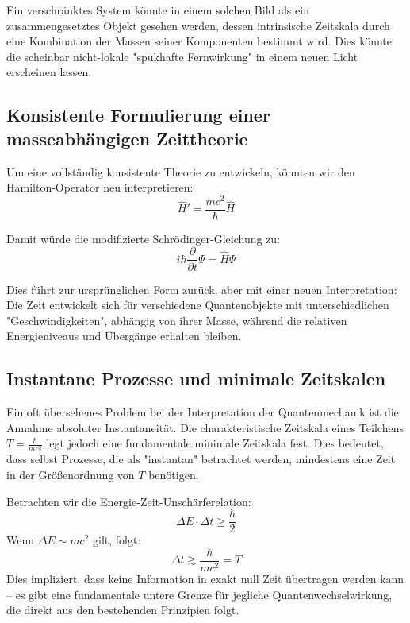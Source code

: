 \documentclass{article}
\begin{document}
	Ein verschränktes System könnte in einem solchen Bild als ein zusammengesetztes Objekt gesehen werden, dessen intrinsische Zeitskala durch eine Kombination der Massen seiner Komponenten bestimmt wird. Dies könnte die scheinbar nicht-lokale "spukhafte Fernwirkung" in einem neuen Licht erscheinen lassen.
	
	\subsection{Konsistente Formulierung einer masseabhängigen Zeittheorie}
	
	Um eine vollständig konsistente Theorie zu entwickeln, könnten wir den Hamilton-Operator neu interpretieren:
	\begin{equation}
		\hat{H}' = \frac{mc^2}{\hbar} \hat{H}
	\end{equation}
	
	Damit würde die modifizierte Schrödinger-Gleichung zu:
	\begin{equation}
		i\hbar \frac{\partial}{\partial t}\Psi = \hat{H}\Psi
	\end{equation}
	
	Dies führt zur ursprünglichen Form zurück, aber mit einer neuen Interpretation: Die Zeit entwickelt sich für verschiedene Quantenobjekte mit unterschiedlichen "Geschwindigkeiten", abhängig von ihrer Masse, während die relativen Energieniveaus und Übergänge erhalten bleiben.
	
	\subsection{Instantane Prozesse und minimale Zeitskalen}
	
	Ein oft übersehenes Problem bei der Interpretation der Quantenmechanik ist die Annahme absoluter Instantaneität. Die charakteristische Zeitskala eines Teilchens $T = \frac{\hbar}{mc^2}$ legt jedoch eine fundamentale minimale Zeitskala fest. Dies bedeutet, dass selbst Prozesse, die als "instantan" betrachtet werden, mindestens eine Zeit in der Größenordnung von $T$ benötigen.
	
	Betrachten wir die Energie-Zeit-Unschärferelation:
	\begin{equation}
		\Delta E \cdot \Delta t \geq \frac{\hbar}{2}
	\end{equation}
	Wenn $\Delta E \sim mc^2$ gilt, folgt:
	\begin{equation}
		\Delta t \gtrsim \frac{\hbar}{mc^2} = T
	\end{equation}
	Dies impliziert, dass keine Information in exakt null Zeit übertragen werden kann – es gibt eine fundamentale untere Grenze für jegliche Quantenwechselwirkung, die direkt aus den bestehenden Prinzipien folgt.
	
\end{document}
